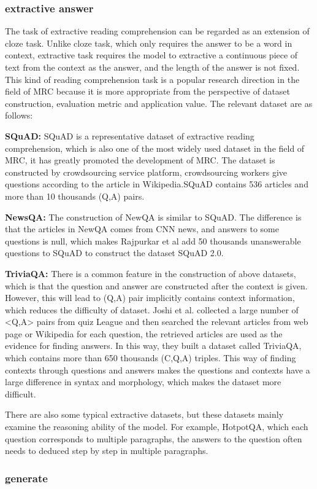 \documentclass{article}
\begin{document}
\subsubsection{extractive answer}
The task of extractive reading comprehension can be regarded as an extension of cloze task. Unlike cloze task, which only requires the 
answer to be a word in context, extractive task requires the model to extractive a continuous piece of text from the context as 
the answer, and the length of the answer is not fixed. This kind of reading comprehension task is a popular research direction 
in the field of MRC because it is more appropriate from the perspective of dataset construction, evaluation metric and application value. 
The relevant dataset are as follows:

\noindent\textbf{SQuAD: }SQuAD is a representative dataset of extractive reading comprehension, which is also one of the most widely used 
dataset in the field of MRC, it has greatly promoted the development of MRC. The dataset is constructed by crowdsourcing service platform, crowdsourcing workers give 
questions according to the article in Wikipedia.SQuAD contains 536 articles and more than 10 thousands (Q,A) pairs. 

\noindent\textbf{NewsQA: }The construction of NewQA is similar to SQuAD. The difference is that the articles in NewQA comes from CNN news, and 
answers to some questions is null, which makes Rajpurkar et al add 50 thousands unanswerable questions to SQuAD to construct the dataset SQuAD 2.0.

\noindent\textbf{TriviaQA: }There is a common feature in the construction of above datasets, which is that the question and answer 
are constructed after the context is given. However, this will lead to (Q,A) pair implicitly contains context information, which reduces the 
difficulty of dataset. Joshi et al. collected a large number of <Q,A> pairs from quiz League and then searched the relevant articles from web page or Wikipedia for 
each question, the retrieved articles are used as the evidence for finding answers. In this way, they built a dataset called TriviaQA, which contains more than 650 thousands (C,Q,A) triples. 
This way of finding contexts through questions and answers makes the questions and contexts have a large difference in syntax and morphology, which makes the dataset more difficult.

There are also some typical extractive datasets, but these datasets mainly examine the reasoning ability of the model. For example, HotpotQA, which each question corresponds to multiple paragraphs, 
the answers to the question often needs to deduced step by step in multiple paragraphs. 

\subsubsection{generate}
\end{document}
